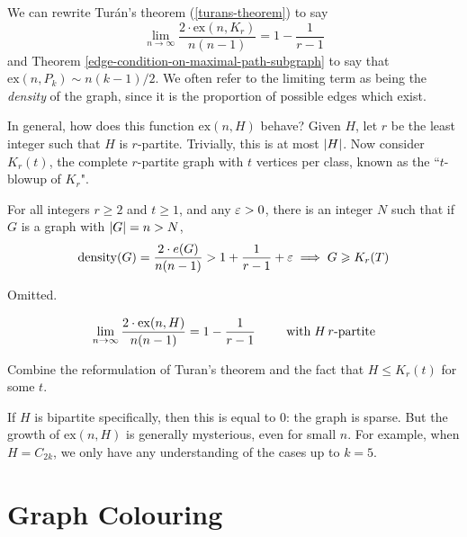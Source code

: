 \documentclass{article}
\begin{document}
We can rewrite Tur\'an's theorem (\ref{turans-theorem}) to say
\[
\lim_{n \to \infty} \frac{2 \cdot \mathrm{ex}(n, K_r)}{n(n-1)} = 1 - \frac{1}{r-1}
\]
and Theorem \ref{edge-condition-on-maximal-path-subgraph} to say that $\mathrm{ex}(n, P_k) \sim n(k-1)/2$. We often refer to the limiting term as being the \textit{density} of the graph, since it is the proportion of possible edges which exist.

In general, how does this function $\mathrm{ex}(n, H)$ behave? Given $H$, let $r$ be the least integer such that $H$ is $r$-partite. Trivially, this is at most $\left\lvert H \right\rvert$. Now consider $K_r(t)$, the complete $r$-partite graph with $t$ vertices per class, known as the ``$t$-blowup of $K_r$". 

\begin{theorem}
    \label{erdos-stone-theorem}
    For all integers $r \geq 2$ and $t \geq 1$, and any $\varepsilon > 0$, there is an integer $N$ such that if $G$ is a graph with $\left\lvert G \right\rvert = n > N$,
    \[
	\mathrm{density}(G) = \frac{2 \cdot e(G)}{n(n-1)} > 1 + \frac{1}{r-1} + \varepsilon \implies G \geqslant K_r(T)
	\]
\end{theorem}

\begin{prf}
    Omitted.
\end{prf}

\begin{corollary}
    \[
	\lim_{n \to \infty} \frac{2 \cdot \mathrm{ex}(n, H)}{n(n-1)} = 1 - \frac{1}{r-1} \qquad \mathrel{\, \text{with}} H \, r\text{-partite}
	\]
\end{corollary}

\begin{prf}
    Combine the reformulation of Turan's theorem and the fact that $H \leq K_r(t)$ for some $t$.
\end{prf}

\begin{note}
	If $H$ is bipartite specifically, then this is equal to 0: the graph is sparse. But the growth of $\mathrm{ex}(n, H)$ is generally mysterious, even for small $n$. For example, when $H = C_{2k}$, we only have any understanding of the cases up to $k = 5$.
\end{note}


\pagebreak
\section{Graph Colouring}
\end{document}
